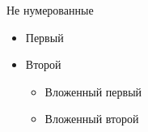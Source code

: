 \documentclass{article}
\begin{document}
Не нумерованные

\begin{itemize}
\item Первый
\item Второй
\begin{itemize}
\item Вложенный первый
\item Вложенный второй
\end{itemize}
\end{itemize}


\end{document}
